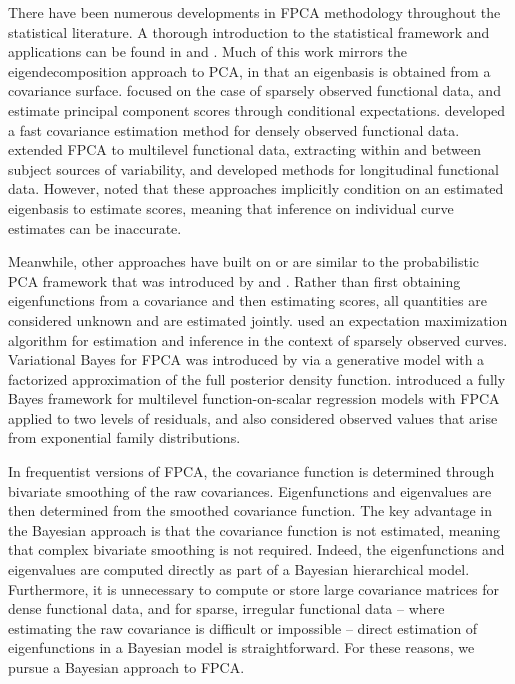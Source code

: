 \documentclass[ba]{imsart}
\numberwithin{equation}{section}
\theoremstyle{plain}
\begin{document}
There have been numerous developments in FPCA methodology throughout the statistical literature.
A thorough introduction to the statistical framework and applications can be found in \citet[Chapter~8]{ramsay05}
and \citet[Section~2]{wang16}. Much of this work mirrors the eigendecomposition approach to PCA, in that an
eigenbasis is obtained from a covariance surface. \citet{yao05} focused on the case of sparsely observed functional
data, and estimate
principal component scores through conditional expectations. \citet{xiao16} developed a fast covariance estimation method for densely observed functional data. \citet{di09} extended FPCA to multilevel functional data, extracting within and
between subject sources of variability, and \citet{greven2011} developed methods for longitudinal functional data. However,
\citet{goldsmith13} noted that these approaches implicitly condition on an estimated eigenbasis to estimate scores, meaning that inference on
individual curve estimates can be inaccurate.

Meanwhile, other approaches have built on or are similar to the probabilistic PCA framework that was introduced by \citet{tipping99} and \citet{bishop99}. Rather than first obtaining eigenfunctions from a covariance and then estimating scores, all quantities are considered unknown and are estimated jointly.  \citet{james2000} used an expectation maximization algorithm for estimation and inference in the context of sparsely observed curves. Variational Bayes for FPCA was introduced by \citet{vanderlinde08} via a generative model with a factorized approximation of the full posterior density function. \citet{Goldsmith15} introduced a fully Bayes framework for multilevel function-on-scalar
regression models with FPCA applied to two levels of residuals,
and also considered observed values that arise from exponential family distributions. 

In frequentist versions of FPCA, the covariance function is determined through bivariate smoothing of the raw
covariances. Eigenfunctions and eigenvalues are then determined from the smoothed covariance function.
The key advantage in the Bayesian approach is that the covariance function is not estimated, meaning that
complex bivariate smoothing is not required. Indeed, the eigenfunctions and eigenvalues are computed directly
as part of a Bayesian hierarchical model. Furthermore, it is unnecessary to compute or store large covariance matrices for dense functional data, and for sparse, irregular functional data -- where estimating the raw covariance is difficult or impossible -- direct estimation of eigenfunctions in a Bayesian model is straightforward. For these reasons, we pursue a Bayesian approach to FPCA.
\end{document}
